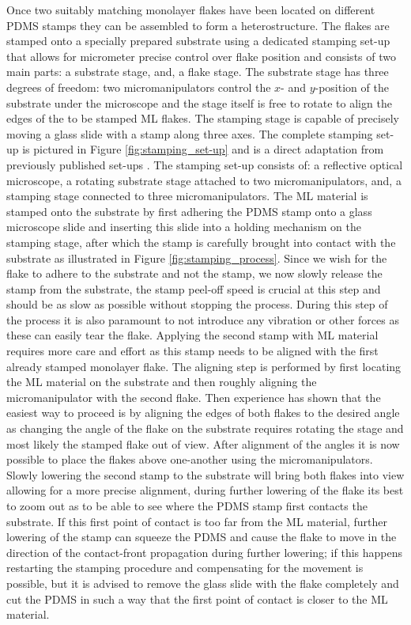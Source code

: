 Once two suitably matching monolayer flakes have been located on different PDMS stamps they can be assembled to form a heterostructure.
The flakes are stamped onto a specially prepared substrate using a dedicated stamping set-up that allows for micrometer precise control over flake position and consists of two main parts: a substrate stage, and, a flake stage.
The substrate stage has three degrees of freedom: two micromanipulators control the $x$- and $y$-position of the substrate under the microscope and the stage itself is free to rotate to align the edges of the to be stamped ML flakes.
The stamping stage is capable of precisely moving a glass slide with a stamp along three axes.
The complete stamping set-up is pictured in Figure \ref{fig:stamping_set-up} and is a direct adaptation from previously published set-ups \cite{castellanos-gomezDeterministicTransferTwodimensional2014, castellanos-gomezDeterministicTransferTwodimensional2014a}.
The stamping set-up consists of: a reflective optical microscope, a rotating substrate stage attached to two micromanipulators, and, a stamping stage connected to three micromanipulators.
The ML material is stamped onto the substrate by first adhering the PDMS stamp onto a glass microscope slide and inserting this slide into a holding mechanism on the stamping stage, after which the stamp is carefully brought into contact with the substrate as illustrated in Figure \ref{fig:stamping_process}.
Since we wish for the flake to adhere to the substrate and not the stamp, we now slowly release the stamp from the substrate, the stamp peel-off speed is crucial at this step and should be as slow as possible without stopping the process.
During this step of the process it is also paramount to not introduce any vibration or other forces as these can easily tear the flake.
Applying the second stamp with ML material requires more care and effort as this stamp needs to be aligned with the first already stamped monolayer flake. The aligning step is performed by first locating the ML material on the substrate and then roughly aligning the micromanipulator with the second flake. Then experience has shown that the easiest way to proceed is by aligning the edges of both flakes to the desired angle as changing the angle of the flake on the substrate requires rotating the stage and most likely the stamped flake out of view. After alignment of the angles it is now possible to place the flakes above one-another using the micromanipulators. Slowly lowering the second stamp to the substrate will bring both flakes into view allowing for a more precise alignment, during further lowering of the flake its best to zoom out as to be able to see where the PDMS stamp first contacts the substrate. If this first point of contact is too far from the ML material, further lowering of the stamp can squeeze the PDMS and cause the flake to move in the direction of the contact-front propagation during further lowering; if this happens restarting the stamping procedure and compensating for the movement is possible, but it is advised to remove the glass slide with the flake completely and cut the PDMS in such a way that the first point of contact is closer to the ML material.
